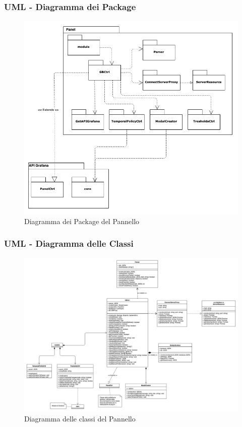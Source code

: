 \subsubsection{UML - Diagramma dei Package}
\begin{figure}[H]
\begin{center}
	\includegraphics[scale=0.6]{./images/panelPackage.png} 
\end{center}
\caption{Diagramma dei Package del Pannello}
\end{figure}

\begin{landscape}
\subsubsection{UML - Diagramma delle Classi}
\begin{figure}[H]
	\begin{center}
		\includegraphics[scale=0.27]{./images/panelClassi.png} 
	\end{center}
	\caption{Diagramma delle classi del Pannello}
\end{figure}
\end{landscape}


